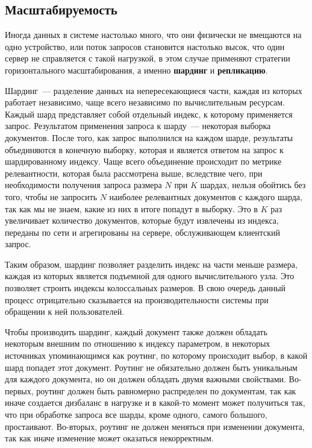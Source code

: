 \subsection{Масштабируемость}

Иногда данных в системе настолько много, что они физически не вмещаются на одно устройство, или поток запросов становится настолько высок, что один сервер не справляется с такой нагрузкой, в этом случае применяют стратегии горизонтального масштабирования, а именно \textbf{шардинг} и \textbf{репликацию}.

Шардинг~--- разделение данных на непересекающиеся части, каждая из которых работает независимо, чаще всего независимо по вычислительным ресурсам. Каждый шард представляет собой отдельный индекс, к которому применяется запрос. Результатом применения запроса к шарду~--- некоторая выборка документов. После того, как запрос выполнился на каждом шарде, результаты объединяются в конечную выборку, которая и является ответом на запрос к шардированному индексу. Чаще всего объединение происходит по метрике релевантности, которая была рассмотрена выше, вследствие чего, при необходимости получения запроса размера $N$ при $K$ шардах, нельзя обойтись без того, чтобы не запросить $N$ наиболее релевантных документов с каждого шарда, так как мы не знаем, какие из них в итоге попадут в выборку. Это в $K$ раз увеличивает количество документов, которые будут извлечены из индекса, переданы по сети и агрегированы на сервере, обслуживающем клиентский запрос.

Таким образом, шардинг позволяет разделить индекс на части меньше размера, каждая из которых является подъемной для одного вычислительного узла. Это позволяет строить индексы колоссальных размеров. В свою очередь данный процесс отрицательно сказывается на производительности системы при обращении к ней пользователей.

Чтобы производить шардинг, каждый документ также должен обладать некоторым внешним по отношению к индексу параметром, в некоторых источниках упоминающимся как роутинг, по которому происходит выбор, в какой шард попадет этот документ. Роутинг не обязательно должен быть уникальным для каждого документа, но он должен обладать двумя важными свойствами. Во-первых, роутинг должен быть равномерно распределен по документам, так как иначе создается дизбаланс в нагрузке и в какой-то момент может получиться так, что при обработке запроса все шарды, кроме одного, самого большого, простаивают. Во-вторых, роутинг не должен меняться при изменении документа, так как иначе изменение может оказаться некорректным.

